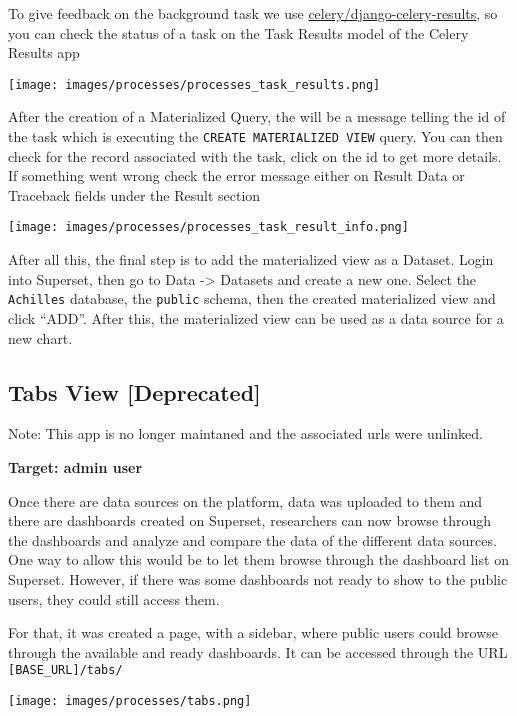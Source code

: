 \documentclass[
]{book}
\begin{document}
To give feedback on the background task we use \href{https://github.com/celery/django-celery-results}{celery/django-celery-results}, so you can check the status of a task on the Task Results model of the Celery Results app

\texttt{[image: images/processes/processes\_task\_results.png]}

After the creation of a Materialized Query, the will be a message telling the id of the task which is executing the \texttt{CREATE\ MATERIALIZED\ VIEW} query. You can then check for the record associated with the task, click on the id to get more details. If something went wrong check the error message either on Result Data or Traceback fields under the Result section

\texttt{[image: images/processes/processes\_task\_result\_info.png]}

After all this, the final step is to add the materialized view as a Dataset. Login into Superset, then go to Data -\textgreater{} Datasets and create a new one. Select the \texttt{Achilles} database, the \texttt{public} schema, then the created materialized view and click ``ADD''. After this, the materialized view can be used as a data source for a new chart.

\hypertarget{tabs-view-deprecated}{%
\subsection*{Tabs View {[}Deprecated{]}}\label{tabs-view-deprecated}}

Note: This app is no longer maintaned and the associated urls were unlinked.

\textbf{Target: admin user}

Once there are data sources on the platform, data was uploaded to them and there are dashboards created on Superset, researchers can now browse through the dashboards and analyze and compare the data of the different data sources.
One way to allow this would be to let them browse through the dashboard list on Superset. However, if there was some dashboards not ready to show to the public users, they could still access them.

For that, it was created a page, with a sidebar, where public users could browse through the available and ready dashboards.
It can be accessed through the URL \texttt{{[}BASE\_URL{]}/tabs/}

\texttt{[image: images/processes/tabs.png]}
\end{document}
